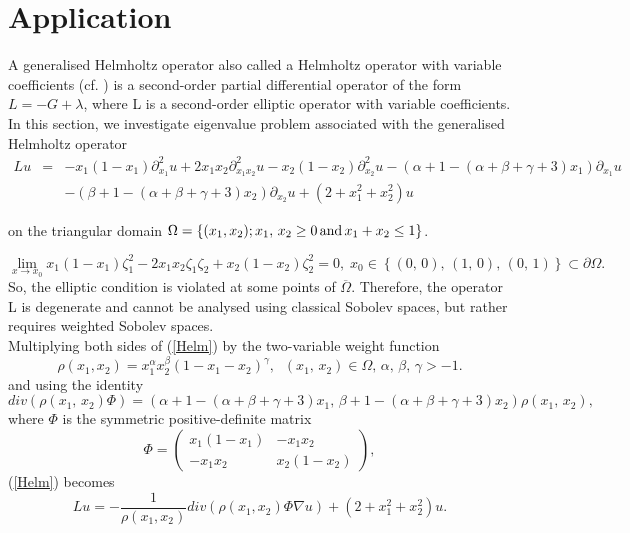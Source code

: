 \documentclass[11pt]{article}
\begin{document}
	\section{Application}
	A generalised Helmholtz operator also called a Helmholtz operator with variable coefficients (cf. \cite{CD})  is a second-order partial differential operator of the form $L=-G+\lambda$, where L is a second-order elliptic operator with variable coefficients.
	In this section, we investigate eigenvalue problem associated with the generalised  Helmholtz operator
		\begin{eqnarray}\label{Helm}
		Lu&=&-x_1(1-x_1)\partial_{x_1}^2u+2x_1x_2\partial_{x_1x_2}^2u-x_2(1-x_2)\partial_{x_2}^2u-(\alpha+1-(\alpha+\beta+\gamma+3)x_1)\partial_{x_1}u\\
		&&-(\beta+1-(\alpha+\beta+\gamma+3)x_2)\partial_{x_2}u+(2+x_1^2+x_2^2)u\nonumber
	\end{eqnarray}
	
on the triangular domain  $\Omega=\left\{(x_1,x_2);x_1,\,x_2\geq 0\,{\rm and}\, x_1+x_2\leq 1\right\}$. 
	
$$\lim_{x \to x_0}x_1(1-x_1)\zeta_1^2-2x_1x_2\zeta_1\zeta_2+x_2(1-x_2)\zeta_2^2
=0,\;x_0\in\left\{(0,\,0),\,(1,\,0),\,(0,\,1)\right\}\subset\partial\Omega.$$
So, the elliptic condition is violated at some points of $\overline{\Omega}$. Therefore, the operator L is degenerate and cannot be analysed using classical Sobolev spaces, but rather requires weighted Sobolev spaces.\\  Multiplying both sides of (\ref{Helm}) by the  two-variable  weight function 
	\begin{equation}\label{TW}
		\rho(x_1,x_2)=x_1^{\alpha}x_2^{\beta}\left(1-x_1-x_2\right)^{\gamma},\;\; (x_1,\,x_2)\in\Omega,\, \alpha,\,\beta,\,\gamma >-1.
	\end{equation} and using the identity \begin{equation}\label{peq}
		div(\rho(x_1,\,x_2)\Phi)=\left(\alpha+1-\left(\alpha+\beta+\gamma+3\right)x_1,\,\beta+1-\left(\alpha+\beta+\gamma+3\right)x_2\right)\rho(x_1,\,x_2),
	\end{equation} where $\Phi$ is the symmetric positive-definite matrix  
	\begin{equation}\label{matrix}
		\varPhi=\left(\begin{matrix}
			x_1(1-x_1)&-x_1x_2\\
			-x_1x_2&x_2(1-x_2)
		\end{matrix}\right),
	\end{equation}
	 (\ref{Helm}) becomes\\ $$L{u}=-\frac{1}{\rho(x_1,x_2)}div(\rho(x_1,x_2)\Phi\nabla u)+(2+{x_1^2+x_2^2})u.$$
	 
\end{document}
